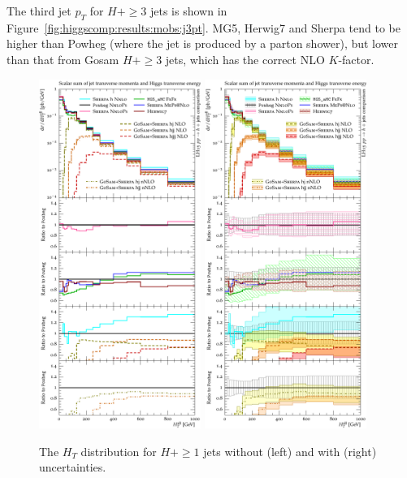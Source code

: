 The third jet $p_T$ for $H+\ge3$ jets is shown in
Figure~\ref{fig:higgscomp:results:mobs:j3pt}. MG5, Herwig7 and Sherpa
tend to be higher than Powheg (where the jet is produced by a parton
shower), but lower than that from Gosam $H+\ge3$ jets, which has the
correct NLO $K$-factor.

\begin{figure}[t!]
  \centering
  \includegraphics[width=0.47\textwidth]{figures/hjetscomp_u_HT_all.pdf}
  \hfill
  \includegraphics[width=0.47\textwidth]{figures/hjetscomp_HT_all.pdf}
  \caption{
    The $H_T$ distribution for $H+\ge1$ jets 
    without (left) and with (right) uncertainties.
    \label{fig:higgscomp:results:mobs:HT_all}
  }
\end{figure}

